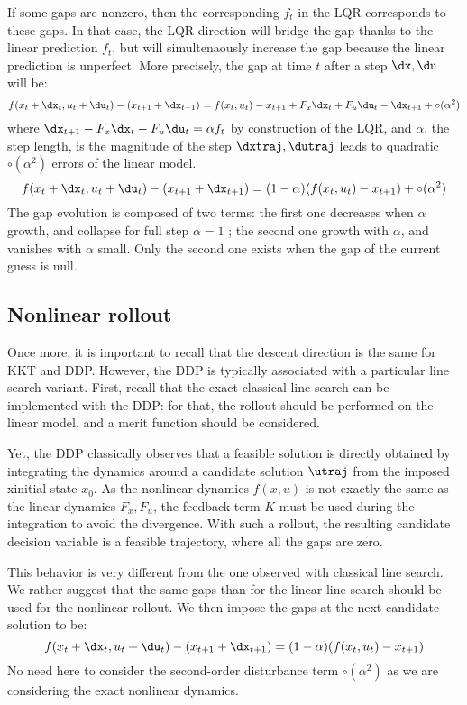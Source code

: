 \documentclass[10pt,a4paper]{article}
\begin{document}
If some gaps are nonzero, then the corresponding $f_t$ in the LQR corresponds to these gaps.
In that case, the LQR direction will bridge the gap thanks to the linear prediction $f_t$, but will simultenaously increase the gap because the linear prediction is unperfect.
More precisely, the gap at time $t$ after a step $\dx,\du$ will be:
$$
f(x_t+\dx_t,u_t+\du_t) - (x_{t+1}+\dx_{t+1})= f(x_t,u_t)-x_{t+1} + F_x \dx_t + F_u \du_t  -  \dx_{t+1} + \circ(\alpha^2)
$$
where $\dx_{t+1} - F_x \dx_t - F_u \du_t = \alpha f_t $ by construction of the LQR, and $\alpha$, the step length, is the magnitude of the step $\dxtraj,\dutraj$ leads to quadratic $\circ(\alpha^2)$ errors of the linear model.
$$
f(x_t+\dx_t,u_t+\du_t) - (x_{t+1}+\dx_{t+1}) = (1-\alpha) (f(x_t,u_t) - x_{t+1}) + \circ(\alpha^2)
$$
The gap evolution is composed of two terms: the first one decreases when $\alpha$ growth, and collapse for full step $\alpha=1$ ; the second one growth with $\alpha$, and vanishes with $\alpha$ small.
Only the second one exists when the gap of the current guess is null.

\subsection{Nonlinear rollout}

Once more, it is important to recall that the descent direction is the same for KKT and DDP.
However, the DDP is typically associated with a particular line search variant.
First, recall that the exact classical line search can be implemented with the DDP: for that, the rollout should be performed on the linear model, and a merit function should be considered.

Yet, the DDP classically observes that a feasible solution is directly obtained by integrating the dynamics around a candidate solution $\utraj$ from the imposed xinitial state $x_0$.
As the nonlinear dynamics $f(x,u)$ is not exactly the same as the linear dynamics $F_x,F_u$, the feedback term $K$ must be used during the integration to avoid the divergence.
With such a rollout, the resulting candidate decision variable is a feasible trajectory, where all the gaps are zero.

This behavior is very different from the one observed with classical line search.
We rather suggest that the same gaps than for the linear line search should be used for the nonlinear rollout.
We then impose the gaps at the next candidate solution to be:
$$
f(x_t+\dx_t,u_t+\du_t) - (x_{t+1}+\dx_{t+1}) = (1-\alpha) (f(x_t,u_t) - x_{t+1})
$$
No need here to consider the second-order disturbance term $\circ(\alpha^2)$ as we are considering the exact nonlinear dynamics.
\end{document}
